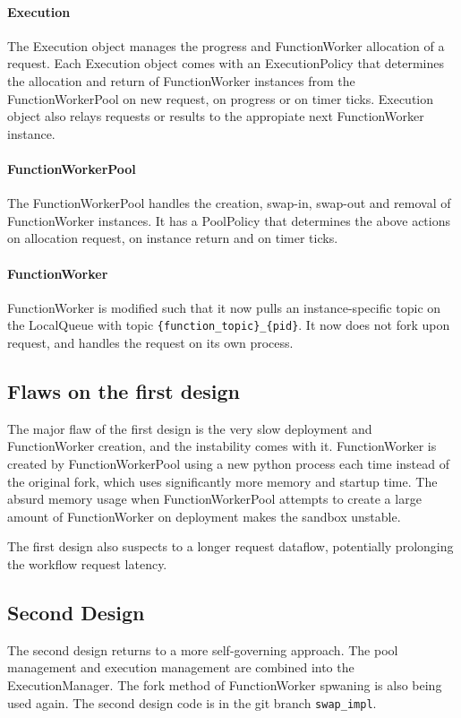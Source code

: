 \documentclass[conference]{IEEEtran}
\begin{document}
\paragraph{Execution}
The Execution object manages the progress and FunctionWorker allocation of a request. Each Execution object comes with an ExecutionPolicy that determines the allocation and return of FunctionWorker instances from the FunctionWorkerPool on new request, on progress or on timer ticks. Execution object also relays requests or results to the appropiate next FunctionWorker instance.

\paragraph{FunctionWorkerPool}
The FunctionWorkerPool handles the creation, swap-in, swap-out and removal of FunctionWorker instances. It has a PoolPolicy that determines the above actions on allocation request, on instance return and on timer ticks.

\paragraph{FunctionWorker}
FunctionWorker is modified such that it now pulls an instance-specific topic on the LocalQueue with topic \verb|{function_topic}_{pid}|. It now does not fork upon request, and handles the request on its own process.

\subsection{Flaws on the first design}
The major flaw of the first design is the very slow deployment and FunctionWorker creation, and the instability comes with it. FunctionWorker is created by FunctionWorkerPool using a new python process each time instead of the original fork, which uses significantly more memory and startup time. The absurd memory usage when FunctionWorkerPool attempts to create a large amount of FunctionWorker on deployment makes the sandbox unstable.

The first design also suspects to a longer request dataflow, potentially prolonging the workflow request latency.

\subsection{Second Design}
The second design returns to a more self-governing approach. The pool management and execution management are combined into the ExecutionManager. The fork method of FunctionWorker spwaning is also being used again. The second design code is in the git branch \verb|swap_impl|.
\end{document}

